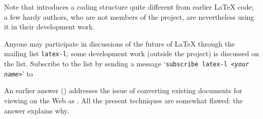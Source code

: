 Note that  introduces a coding structure quite
different from earlier \LaTeX{} code; a few hardy authors, who are not
members of the project, are nevertheless using it in their development
work.

Anyone may participate in discussions of the future of \LaTeX{}
through the mailing list \texttt{latex-l}; some development work
(outside the project) is discussed on the list.  Subscribe to the list
by sending a message `\texttt{subscribe latex-l <\emph{your name}>}'
to  
\begin{ctanrefs}
\item[l3experimental \nothtml{\rmfamily}bundle]
\item[l3kernel \nothtml{\rmfamily}bundle]
\item[\nothtml{\rmfamily}\LaTeX{} project publications]
\item[l3packages \nothtml{\rmfamily}bundle]
\end{ctanrefs}


An earlier answer %
()
addresses the issue of converting existing \AllTeX{} documents for
viewing on the Web as .  All the present techniques are
somewhat flawed: the answer explains why.

